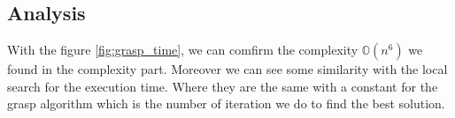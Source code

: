 
\subsection{Analysis}

With the figure \ref{fig:grasp_time}, we can comfirm the complexity $\mathbb{O}(n^6)$ we found in the complexity part.
Moreover we can see some similarity with the local search for the execution time. Where they are the same with a constant for the grasp algorithm 
which is the number of iteration we do to find the best solution.